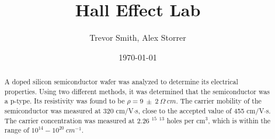 \documentclass[aps,prl,reprint]{revtex4-2}
\begin{document}

\title{Hall Effect Lab}


\author{Trevor Smith, Alex Storrer}


\date{\today}

\begin{abstract}
	A doped silicon semiconductor wafer was analyzed to determine its electrical properties. 
	Using two different methods, it was determined that the semiconductor was a p-type.
	Its resistivity was found to be $\rho = 9\ \pm\ 2\ \Omega\ cm$.
	The carrier mobility of the semiconductor was  
	measured at 320  cm/V$\cdot$s, close to the accepted value of 455 cm/V$\cdot$s. The 
	carrier concentration was measured at 2.26 $^{15}$  $^{13}$  
	holes per cm$^{3}$, which is within the range of $10^{14}-10^{20}\ cm^{-1}$.
\end{abstract}


\maketitle
\end{document}
